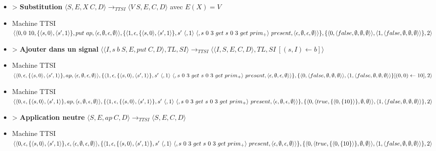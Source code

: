 \documentclass[10pt,a4paper]{article}
\begin{document}
\begin{itemize}
					\item[] > \textbf{Substitution} $\langle S,E,X~C,D\rangle
					\longrightarrow_{TTSI} 
					\langle V~S,E,C,D\rangle$ avec $E(X) = V$
					\item[] Machine TTSI $\langle\langle 0,0~10,\{\langle s,0\rangle,\langle s',1\rangle\},put~ap,\langle\epsilon,\emptyset,\epsilon,\emptyset\rangle\rangle,\{\langle 1,\epsilon,\{\langle s,0\rangle,\langle s',1\rangle\}, s'~\langle,1\rangle~\langle,s~0~3~get~s~0~3~get~prim_{+}\rangle~present ,\\\langle\epsilon,\emptyset,\epsilon,\emptyset\rangle\rangle\},\{\langle 0,\langle false,\emptyset,\emptyset,\emptyset\rangle\rangle,\langle 1,\langle false,\emptyset,\emptyset,\emptyset\rangle\rangle\},2\rangle$
					\item[] > \textbf{Ajouter dans un signal} $\langle\langle I,s~b~S,E,put~C,D\rangle,TL,SI\rangle
					\longrightarrow_{TTSI} 
					\langle\langle I,S,E,C,D\rangle,TL,SI~[(s,I) \leftarrow b]\rangle$ 
					\item[] Machine TTSI $\langle\langle 0,\epsilon,\{\langle s,0\rangle,\langle s',1\rangle\},ap,\langle\epsilon,\emptyset,\epsilon,\emptyset\rangle\rangle,\{\langle 1,\epsilon,\{\langle s,0\rangle,\langle s',1\rangle\}, s'~\langle,1\rangle~\langle,s~0~3~get~s~0~3~get~prim_{+}\rangle~present ,\\\langle\epsilon,\emptyset,\epsilon,\emptyset\rangle\rangle\},\{\langle 0,\langle false,\emptyset,\emptyset,\emptyset\rangle\rangle,\langle 1,\langle false,\emptyset,\emptyset,\emptyset\rangle\rangle\}[(0,0) \leftarrow 10],2\rangle$
					\item[] Machine TTSI $\langle\langle 0,\epsilon,\{\langle s,0\rangle,\langle s',1\rangle\},ap,\langle\epsilon,\emptyset,\epsilon,\emptyset\rangle\rangle,\{\langle 1,\epsilon,\{\langle s,0\rangle,\langle s',1\rangle\}, s'~\langle,1\rangle~\langle,s~0~3~get~s~0~3~get~prim_{+}\rangle~present ,\\\langle\epsilon,\emptyset,\epsilon,\emptyset\rangle\rangle\},\{\langle 0,\langle true,\{\langle 0,\{10\}\rangle\},\emptyset,\emptyset\rangle\rangle,\langle 1,\langle false,\emptyset,\emptyset,\emptyset\rangle\rangle\},2\rangle$
					\item[] > \textbf{Application neutre} $\langle S,E,ap~C,D\rangle
					\longrightarrow_{TTSI} 
					\langle S,E,C,D\rangle$
					\item[] Machine TTSI $\langle\langle 0,\epsilon,\{\langle s,0\rangle,\langle s',1\rangle\},\epsilon,\langle\epsilon,\emptyset,\epsilon,\emptyset\rangle\rangle,\{\langle 1,\epsilon,\{\langle s,0\rangle,\langle s',1\rangle\}, s'~\langle,1\rangle~\langle,s~0~3~get~s~0~3~get~prim_{+}\rangle~present ,\\\langle\epsilon,\emptyset,\epsilon,\emptyset\rangle\rangle\},\{\langle 0,\langle true,\{\langle 0,\{10\}\rangle\},\emptyset,\emptyset\rangle\rangle,\langle 1,\langle false,\emptyset,\emptyset,\emptyset\rangle\rangle\},2\rangle$

\end{itemize}
\end{document}
